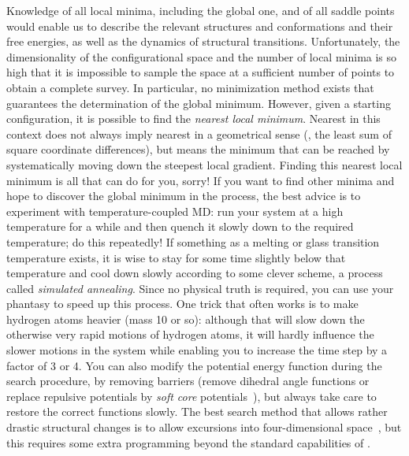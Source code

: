 Knowledge of all local minima, including the global one, and of all
saddle points would enable us to describe the relevant structures and
conformations and their free energies, as well as the dynamics of
structural transitions. Unfortunately, the dimensionality of the
configurational space and the number of local minima is so high that
it is impossible to sample the space at a sufficient number of points
to obtain a complete survey. In particular, no minimization method
exists that guarantees the determination of the global
minimum. However, given a starting configuration, it is possible to
find the {\em nearest local minimum}. Nearest in this context does not
always imply nearest in a geometrical sense ({\ie}, the least sum
of square coordinate differences), but means the minimum that can be
reached by systematically moving down the steepest local
gradient. Finding this nearest local minimum is all that {\gromacs}
can do for you, sorry! If you want to find other minima and hope to
discover the global minimum in the process, the best advice is to
experiment with temperature-coupled MD: run your system at a high
temperature for a while and then quench it slowly down to the required
temperature; do this repeatedly!  If something as a melting or glass
transition temperature exists, it is wise to stay for some time
slightly below that temperature and cool down slowly according to some
clever scheme, a process called {\em simulated annealing}. Since no
physical truth is required, you can use your phantasy to speed up this
process. One trick that often works is to make hydrogen atoms heavier
(mass 10 or so): although that will slow down the otherwise very rapid
motions of hydrogen atoms, it will hardly influence the slower motions
in the system while enabling you to increase the time step by a factor
of 3 or 4. You can also modify the potential energy function during
the search procedure, {\eg} by removing barriers (remove dihedral angle
functions or replace repulsive potentials by {\em soft core}
potentials~\cite{Nilges88}), but always take care to restore the
correct functions slowly. The best search method that allows rather
drastic structural changes is to allow excursions into
four-dimensional space~\cite{Schaik93}, but this requires some extra
programming beyond the standard capabilities of {\gromacs}.

